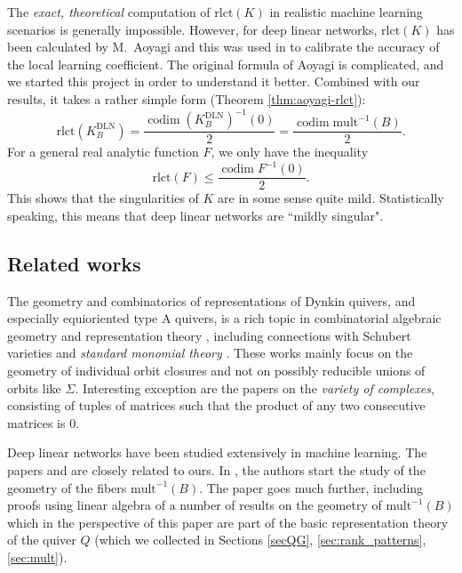 \documentclass[a4paper]{amsart}
\DeclareMathOperator{\codim}{\mathrm{codim}}
\newcommand{\rlct}{\mathrm{rlct}}
\newcommand{\DLN}{\mathrm{DLN}}
\newcommand{\mult}{\mathrm{mult}}
\theoremstyle{plain}
\begin{document}
The \emph{exact, theoretical} computation of $\rlct(K)$ in realistic machine learning scenarios is generally impossible. However, for deep linear networks, $\rlct(K)$ has been calculated by M.~Aoyagi \cite{aoyagi} and this was used in \cite{lau2024locallearningcoefficientsingularityaware} to calibrate the accuracy of the local learning coefficient. The original formula of Aoyagi is complicated, and we started this project in order to understand it better. Combined with our results, it takes a rather simple form (Theorem \ref{thm:aoyagi-rlct}):
\[\rlct(K^{\DLN}_B)=\frac{\codim (K^{\DLN}_B)^{-1}(0)}{2}=\frac{\codim\mult^{-1}(B)}{2}.\]
For a general real analytic function $F$, we only have the inequality 
\[
\rlct(F)\leq\frac{\codim F^{-1}(0)}{2}.
\]
This shows that the singularities of $K$ are in some sense quite mild. Statistically speaking, this means that deep linear networks are  ``mildly singular".

\subsection{Related works}\label{sec:related}

The geometry and combinatorics of representations of Dynkin quivers, and especially equioriented type A quivers, is a rich topic in combinatorial algebraic geometry and representation theory \cite{abeasis-del_fra,abeasis-del_fra-kraft,abeasis-del_fra:equioriented,FRduke,BFRpositivity,RWY}, including connections with Schubert varieties and {\em standard monomial theory} \cite{zelevinskii:schubert,lakshmibai-magyar:quiver-schubert,kinser:quiver-schubert,knutson-miller-shimozono}. These works mainly focus on the geometry of individual orbit closures and not on possibly reducible unions of orbits like $\Sigma$. Interesting exception are the papers \cite{concini-strickland:complexes,musili-seshadri:schubert-complexes} on the \emph{variety of complexes}, consisting of tuples of matrices such that the product of any two consecutive matrices is $0$.

Deep linear networks have been studied extensively in machine learning. The papers \cite{trager-kohn-bruna:DLN-spurious-critical} and \cite{bhattacharya-shewchuk} are closely related to ours. In \cite{trager-kohn-bruna:DLN-spurious-critical}, the authors start the study of the geometry of the fibers $\mult^{-1}(B)$. The paper \cite{bhattacharya-shewchuk} goes much further, including proofs using linear algebra of a number of results on the geometry of $\mult^{-1}(B)$ which in the perspective of this paper are part of the basic representation theory of the quiver $Q$ (which we collected in Sections \ref{secQG}, \ref{sec:rank_patterns}, \ref{sec:mult}).
\end{document}
